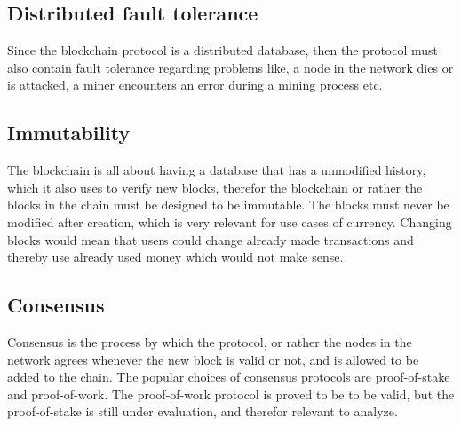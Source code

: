 
\subsection{Distributed fault tolerance}
Since the blockchain protocol is a distributed database, then the protocol must also contain fault tolerance regarding problems like, a node in the network dies or is attacked, a miner encounters an error during a mining process etc.

\subsection{Immutability}
The blockchain is all about having a database that has a unmodified history, which it also uses to verify new blocks, therefor the blockchain or rather the blocks in the chain must be designed to be immutable. The blocks must never be modified after creation, which is very relevant for use cases of currency. Changing blocks would mean that users could change already made transactions and thereby use already used money which would not make sense.

\subsection{Consensus}
Consensus is the process by which the protocol, or rather the nodes in the network agrees whenever the new block is valid or not, and is allowed to be added to the chain. The popular choices of consensus protocols are proof-of-stake and proof-of-work. The proof-of-work protocol is proved to be to be valid, but the proof-of-stake is still under evaluation, and therefor relevant to analyze.

